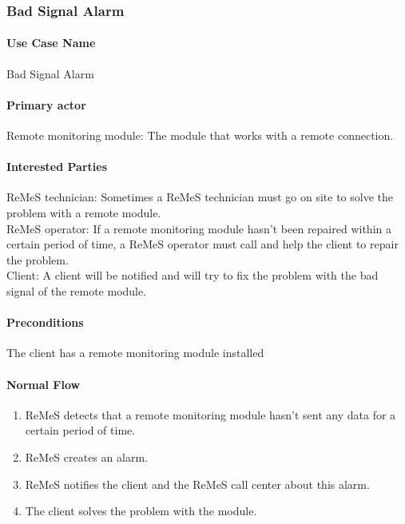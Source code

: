 \subsubsection{Bad Signal Alarm}

\paragraph{Use Case Name}
Bad Signal Alarm
\paragraph{Primary actor}
Remote monitoring module: The module that works with a remote connection.
\paragraph{Interested Parties}
ReMeS technician: Sometimes a ReMeS technician must go on site to solve the problem with a remote module. \\
ReMeS operator: If a remote monitoring module hasn't been repaired within a certain period of time, a ReMeS operator must call and help the client to repair the problem. \\
Client: A client will be notified and will try to fix the problem with the bad signal of the remote module.
\paragraph{Preconditions}
The client has a remote monitoring module installed
\paragraph{Normal Flow}
\begin{enumerate}
	\item ReMeS detects that a remote monitoring module hasn't sent any data for a certain period of time.
	\item ReMeS creates an alarm.
	\item ReMeS notifies the client and the ReMeS call center about this alarm.
	\item The client solves the problem with the module.
\end{enumerate}


